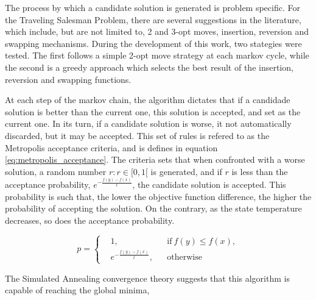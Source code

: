The process by which a candidate solution is generated is problem specific.
For the Traveling Salesman Problem, there are several suggestions in the literature,
which include, but are not limited to, 2 and 3-opt moves, insertion, reversion and swapping mechanisms.
During the development of this work, two stategies were tested.
The first follows a simple 2-opt move strategy at each markov cycle,
while the second is a greedy approach which selects the best result of the insertion, reversion and swapping functions.

At each step of the markov chain, the algorithm dictates 
that if a candidade solution is better than the current one, this solution is accepted,
and set as the current one. In its turn, if a candidate solution is worse,
it not automatically discarded, but it may be accepted.
This set of rules is refered to as the Metropolis acceptance criteria, and is defines in equation \ref{eq:metropolis_acceptance}.
The criteria sets that when confronted with a worse solution,
a random number $r: r \in [0, 1[$ is generated, and if $r$ is less than the acceptance probability, $e^{-\frac{f(y)-f(x)}{t}}$,
the candidate solution is accepted. 
This probability is such that, the lower the objective function difference,
the higher the probability of accepting the solution. On the contrary, as the state temperature decreases,
so does the acceptance probability.  

\begin{equation}
\label{eq:metropolis_acceptance}
  p =  \left \{
  \begin{aligned}
    & 1, && \text{if}\ f(y) \leq f(x),\\
    & e^{-\frac{f(y)-f(x)}{t}},&& \text{otherwise}
  \end{aligned} \right. 
\end{equation}
  
The Simulated Annealing convergence theory suggests that this algorithm is capable of reaching the global minima, 
  









